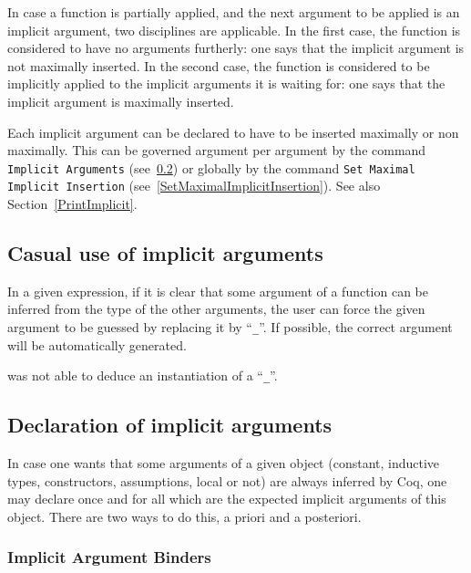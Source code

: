 In case a function is partially applied, and the next argument to be
applied is an implicit argument, two disciplines are applicable. In the
first case, the function is considered to have no arguments furtherly:
one says that the implicit argument is not maximally inserted. In
the second case, the function is considered to be implicitly applied
to the implicit arguments it is waiting for: one says that the
implicit argument is maximally inserted.

Each implicit argument can be declared to have to be inserted
maximally or non maximally. This can be governed argument per argument
by the command {\tt Implicit Arguments} (see~\ref{ImplicitArguments})
or globally by the command {\tt Set Maximal Implicit Insertion}
(see~\ref{SetMaximalImplicitInsertion}). See also
Section~\ref{PrintImplicit}.

\subsection{Casual use of implicit arguments}

In a given expression, if it is clear that some argument of a function
can be inferred from the type of the other arguments, the user can
force the given argument to be guessed by replacing it by ``{\tt \_}''. If
possible, the correct argument will be automatically generated.

\begin{ErrMsgs}

\item {}

  {\Coq} was not able to deduce an instantiation of a ``{\tt \_}''.

\end{ErrMsgs}

\subsection{Declaration of implicit arguments
}
\label{ImplicitArguments}

In case one wants that some arguments of a given object (constant,
inductive types, constructors, assumptions, local or not) are always
inferred by Coq, one may declare once and for all which are the expected
implicit arguments of this object. There are two ways to do this,
a priori and a posteriori.

\subsubsection{Implicit Argument Binders}


